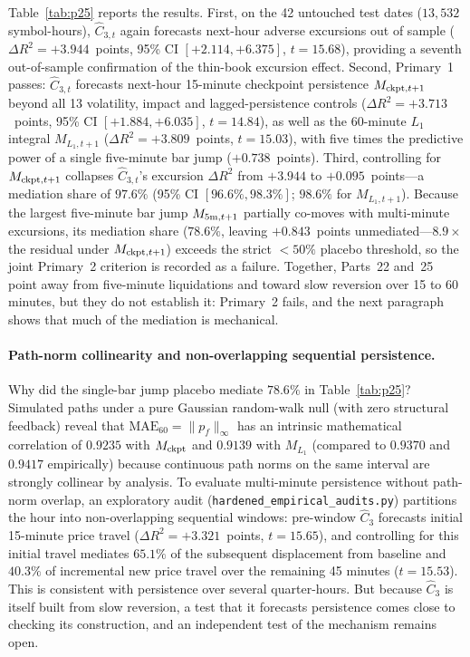 Table~\ref{tab:p25} reports the results. First, on the 42 untouched test dates ($13{,}532$ symbol-hours), $\hat C_{3,t}$ again forecasts next-hour adverse excursions out of sample ($\Delta R^2=+3.944$~points, 95\% CI $[+2.114,+6.375]$, $t=15.68$), providing a seventh out-of-sample confirmation of the thin-book excursion effect. Second, Primary~1 passes: $\hat C_{3,t}$ forecasts next-hour 15-minute checkpoint persistence $M_{{\rm ckpt},t+1}$ beyond all 13 volatility, impact and lagged-persistence controls ($\Delta R^2=+3.713$~points, 95\% CI $[+1.884,+6.035]$, $t=14.84$), as well as the 60-minute $L_1$ integral $M_{L_1,t+1}$ ($\Delta R^2=+3.809$~points, $t=15.03$), with five times the predictive power of a single five-minute bar jump ($+0.738$~points). Third, controlling for $M_{{\rm ckpt},t+1}$ collapses $\hat C_{3,t}$'s excursion $\Delta R^2$ from $+3.944$ to $+0.095$~points---a mediation share of $97.6\%$ (95\% CI $[96.6\%,98.3\%]$; $98.6\%$ for $M_{L_1,t+1}$). Because the largest five-minute bar jump $M_{5{\rm m},t+1}$ partially co-moves with multi-minute excursions, its mediation share ($78.6\%$, leaving $+0.843$~points unmediated---$8.9\times$ the residual under $M_{{\rm ckpt},t+1}$) exceeds the strict $<50\%$ placebo threshold, so the joint Primary~2 criterion is recorded as a failure. Together, Parts~22 and~25 point away from five-minute liquidations and toward slow reversion over 15 to 60 minutes, but they do not establish it: Primary~2 fails, and the next paragraph shows that much of the mediation is mechanical.

\paragraph{Path-norm collinearity and non-overlapping sequential persistence.} Why did the single-bar jump placebo mediate $78.6\%$ in Table~\ref{tab:p25}? Simulated paths under a pure Gaussian random-walk null (with zero structural feedback) reveal that $\mathrm{MAE}_{60}=\|p_f\|_\infty$ has an intrinsic mathematical correlation of $0.9235$ with $M_{\rm ckpt}$ and $0.9139$ with $M_{L_1}$ (compared to $0.9370$ and $0.9417$ empirically) because continuous path norms on the same interval are strongly collinear by analysis. To evaluate multi-minute persistence without path-norm overlap, an exploratory audit (\texttt{hardened\_empirical\_audits.py}) partitions the hour into non-overlapping sequential windows: pre-window $\hat C_3$ forecasts initial 15-minute price travel ($\Delta R^2=+3.321$~points, $t=15.65$), and controlling for this initial travel mediates $65.1\%$ of the subsequent displacement from baseline and $40.3\%$ of incremental new price travel over the remaining 45 minutes ($t=15.53$). This is consistent with persistence over several quarter-hours. But because $\hat C_3$ is itself built from slow reversion, a test that it forecasts persistence comes close to checking its construction, and an independent test of the mechanism remains open.
